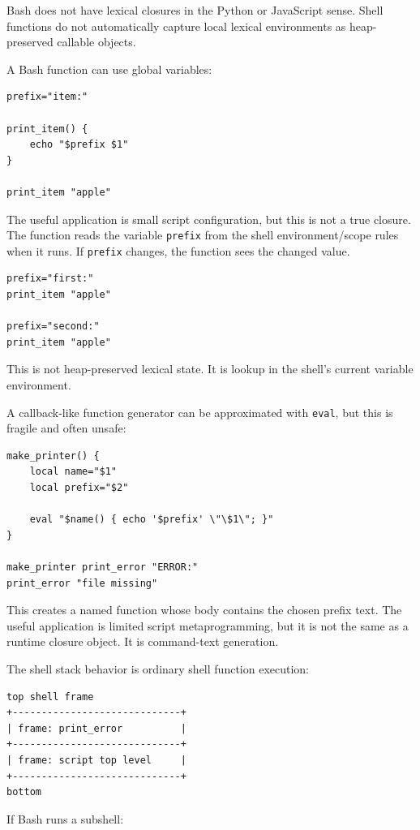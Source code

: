 Bash does not have lexical closures in the Python or JavaScript sense. Shell functions do not automatically capture local lexical environments as heap-preserved callable objects.

A Bash function can use global variables:

\begin{verbatim}
prefix="item:"

print_item() {
    echo "$prefix $1"
}

print_item "apple"
\end{verbatim}

The useful application is small script configuration, but this is not a true closure. The function reads the variable \texttt{prefix} from the shell environment/scope rules when it runs. If \texttt{prefix} changes, the function sees the changed value.

\begin{verbatim}
prefix="first:"
print_item "apple"

prefix="second:"
print_item "apple"
\end{verbatim}

This is not heap-preserved lexical state. It is lookup in the shell's current variable environment.

A callback-like function generator can be approximated with \texttt{eval}, but this is fragile and often unsafe:

\begin{verbatim}
make_printer() {
    local name="$1"
    local prefix="$2"

    eval "$name() { echo '$prefix' \"\$1\"; }"
}

make_printer print_error "ERROR:"
print_error "file missing"
\end{verbatim}

This creates a named function whose body contains the chosen prefix text. The useful application is limited script metaprogramming, but it is not the same as a runtime closure object. It is command-text generation.

The shell stack behavior is ordinary shell function execution:

\begin{verbatim}
top shell frame
+-----------------------------+
| frame: print_error          |
+-----------------------------+
| frame: script top level     |
+-----------------------------+
bottom
\end{verbatim}

If Bash runs a subshell:

